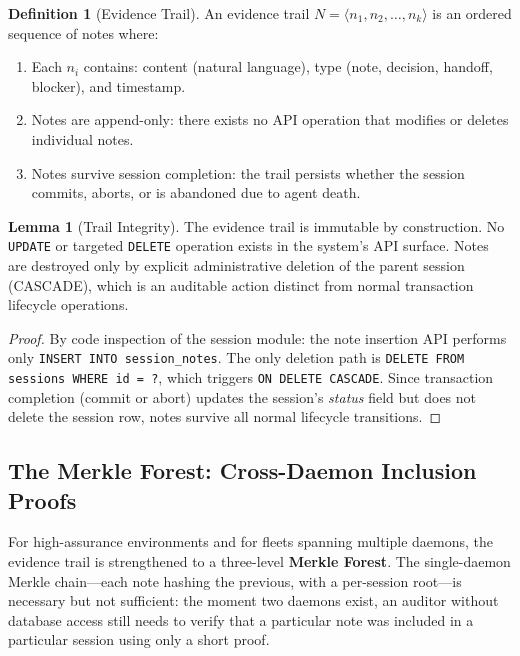\documentclass[11pt,a4paper]{article}
\theoremstyle{definition}
\newtheorem{definition}{Definition}[section]
\newtheorem{lemma}{Lemma}[section]
\theoremstyle{remark}
\begin{document}
\begin{definition}[Evidence Trail]\label{def:evidence}
An evidence trail $N = \langle n_1, n_2, \ldots, n_k \rangle$ is an ordered sequence of notes where:
\begin{enumerate}[nosep]
  \item Each $n_i$ contains: content (natural language), type (note, decision, handoff, blocker), and timestamp.
  \item Notes are append-only: there exists no API operation that modifies or deletes individual notes.
  \item Notes survive session completion: the trail persists whether the session commits, aborts, or is abandoned due to agent death.
\end{enumerate}
\end{definition}

\begin{lemma}[Trail Integrity]\label{lem:integrity}
The evidence trail is immutable by construction. No \texttt{UPDATE} or targeted \texttt{DELETE} operation exists in the system's API surface. Notes are destroyed only by explicit administrative deletion of the parent session (CASCADE), which is an auditable action distinct from normal transaction lifecycle operations.
\end{lemma}

\begin{proof}
By code inspection of the session module: the note insertion API performs only \texttt{INSERT INTO session\_notes}. The only deletion path is \texttt{DELETE FROM sessions WHERE id = ?}, which triggers \texttt{ON DELETE CASCADE}. Since transaction completion (commit or abort) updates the session's \emph{status} field but does not delete the session row, notes survive all normal lifecycle transitions.
\end{proof}

\subsection{The Merkle Forest: Cross-Daemon Inclusion Proofs}\label{sec:merkle-forest}

For high-assurance environments and for fleets spanning multiple daemons, the evidence trail is strengthened to a three-level \textbf{Merkle Forest}. The single-daemon Merkle chain---each note hashing the previous, with a per-session root---is necessary but not sufficient: the moment two daemons exist, an auditor without database access still needs to verify that a particular note was included in a particular session using only a short proof.
\end{document}
